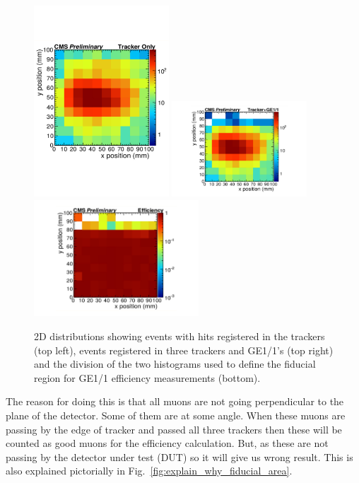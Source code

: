 \begin{figure}[htbp]
    \centering
    \includegraphics[width=0.45\textwidth]{figures/GEM/FiducialAreaCal_TrackerOnly.pdf}%
    \includegraphics[width=0.45\textwidth]{figures/GEM/FiducialAreaCal_TrackerGE11.pdf}\\
    \includegraphics[width=0.55\textwidth]{figures/GEM/FiducialAreaCal_Selection.pdf}\\
    \caption{2D distributions showing events with hits registered in the trackers (top left), events registered in three trackers and GE1/1's (top right) and the division of the two histograms used to define the fiducial region for GE1/1 efficiency measurements (bottom).}
    \label{fig:fiducial_area_sel}
\end{figure}
The reason for doing this is that all muons are not going perpendicular to the plane of the detector. Some of them are at some angle. When these muons are passing by the edge of tracker and passed all three trackers then these will be counted as good muons for the efficiency calculation. But, as these are not passing by the detector under test (DUT) so it will give us wrong result. This is also explained pictorially in Fig.~\ref{fig:explain_why_fiducial_area}.

